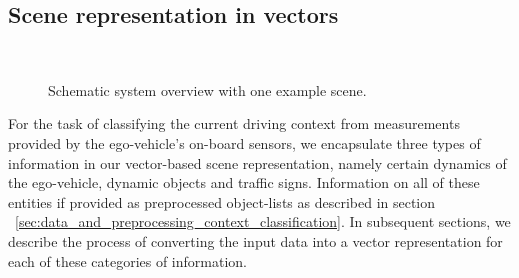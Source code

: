\subsection{Scene representation in vectors}%
\label{subsec:scene_representation_in_vectors_context_classification}
\begin{figure}[th!]
    \centering
    \\
    \caption{Schematic system overview with one example scene.}
    \label{fig:context_class_sys_arch}
\end{figure}

For the task of classifying the current driving context from measurements provided by the ego-vehicle's on-board sensors, we encapsulate three types of information in our vector-based scene representation, namely certain dynamics of the ego-vehicle, dynamic objects and traffic signs.
Information on all of these entities if provided as preprocessed object-lists as described in section ~\ref{sec:data_and_preprocessing_context_classification}.
In subsequent sections, we describe the process of converting the input data into a vector representation for each of these categories of information.


